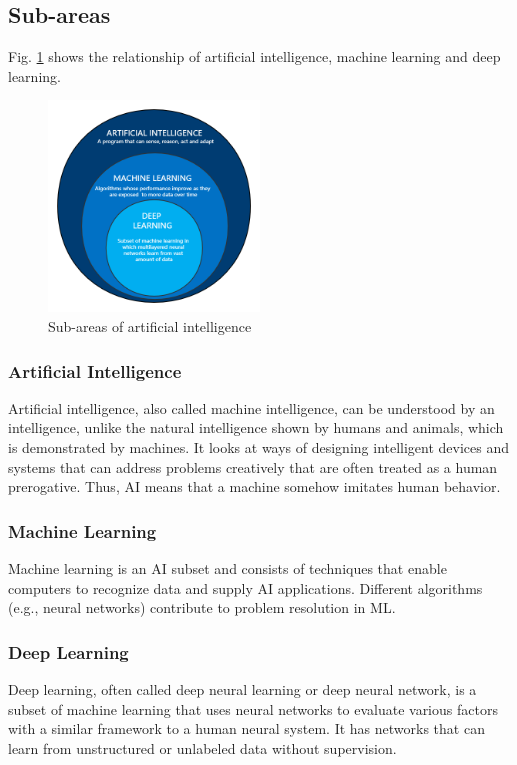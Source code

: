 \subsection{Sub-areas}
Fig. \ref{fig:ai_taxonomy} shows the relationship of artificial intelligence, machine learning and deep learning.
\begin{figure}[htbp]
\centering
\includegraphics[width=0.5\textwidth]{./images/ai_taxonomy.png}
\caption{Sub-areas of artificial intelligence \parencite{Suman2020}}
\label{fig:ai_taxonomy}
\end{figure}

\subsubsection{Artificial Intelligence}
Artificial intelligence, also called machine intelligence, can be understood by an intelligence, unlike the natural intelligence shown by humans and animals, which is demonstrated by machines. It looks at ways of designing intelligent devices and systems that can address problems creatively that are often treated as a human prerogative. Thus, AI means that a machine somehow imitates human behavior.
\subsubsection{Machine Learning} 
Machine learning is an AI subset and consists of techniques that enable computers to recognize data and supply AI applications. Different algorithms (e.g., neural networks) contribute to problem resolution in ML.
\subsubsection{Deep Learning}
Deep learning, often called deep neural learning or deep neural network, is a subset of machine learning that uses neural networks to evaluate various factors with a similar framework to a human neural system. It has networks that can learn from unstructured or unlabeled data without supervision.


